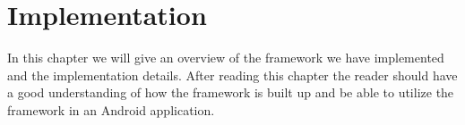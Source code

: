 \chapter{Implementation}
In this chapter we will give an overview of the framework we have implemented and the implementation details. After reading this chapter the reader should have a good understanding of how the framework is built up and be able to utilize the framework in an Android application.



